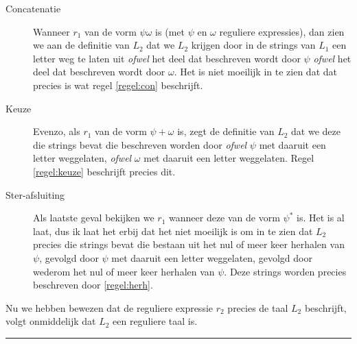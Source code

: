 \documentclass[a4paper,11pt]{article}
\begin{document}
\begin{description}

\item[Concatenatie]

Wanneer $r_{1}$ van de vorm $\psi \omega$ is (met $\psi$ en $\omega$ reguliere
expressies), dan zien we aan de definitie van $L_{2}$ dat we $L_{2}$ krijgen
door in de strings van $L_{1}$ een letter weg te laten uit \emph{ofwel} het
deel dat beschreven wordt door $\psi$ \emph{ofwel} het deel dat beschreven
wordt door $\omega$. Het is niet moeilijk in te zien dat dat precies is wat
regel \ref{regel:con} beschrijft.

\item[Keuze]

Evenzo, als $r_{1}$ van de vorm $\psi + \omega$ is, zegt de definitie van
$L_{2}$ dat we deze die strings bevat die beschreven worden door \emph{ofwel}
$\psi$ met daaruit een letter weggelaten, \emph{ofwel} $\omega$ met daaruit
een letter weggelaten. Regel \ref{regel:keuze} beschrijft precies dit.

\item[Ster-afsluiting]

Als laatste geval bekijken we $r_{1}$ wanneer deze van de vorm $\psi^{*}$
is. Het is al laat, dus ik laat het erbij dat het niet moeilijk is om in
te zien dat $L_{2}$ precies die strings bevat die bestaan uit het nul of
meer keer herhalen van $\psi$, gevolgd door $\psi$ met daaruit een letter
weggelaten, gevolgd door wederom het nul of meer keer herhalen van $\psi$.
Deze strings worden precies beschreven door \ref{regel:herh}.

\end{description}

Nu we hebben bewezen dat de reguliere expressie $r_{2}$ precies de taal
$L_{2}$ beschrijft, volgt onmiddelijk dat $L_{2}$ een reguliere taal is.

\hfill\rule{2.1mm}{2.mm}
\end{document}
